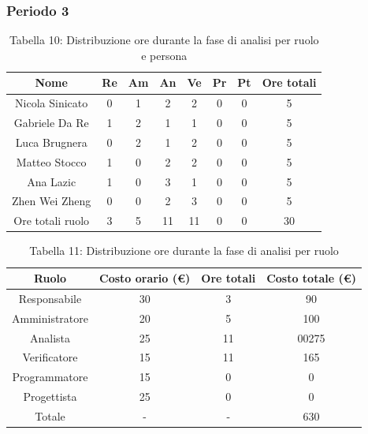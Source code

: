 \subsubsection{Periodo 3}
%
\begin{table}[h]
	\setlength\extrarowheight{5pt}
	\centering
	\begin{tabularx}{\textwidth}{|ccccccc|c|}
		\hline
		\rowcolor{white}
		\textbf{Nome} & \textbf{Re} & \textbf{Am} & \textbf{An} & \textbf{Ve} & \textbf{Pr}& \textbf{Pt} & \textbf{Ore totali} \\
		\hline
		Nicola Sinicato &0&1&2&2&0&0&5 \\
		Gabriele Da Re &1&2&1&1&0&0&5 \\
		Luca Brugnera &0&2&1&2&0&0&5 \\
		Matteo Stocco &1&0&2&2&0&0&5 \\
		Ana Lazic &1&0&3&1&0&0&5 \\
		Zhen Wei Zheng &0&0&2&3&0&0&5 \\
		\hline
		Ore totali ruolo &3&5&11&11&0&0&30 \\
		\hline
	\end{tabularx}
	\vspace{10pt}
	\caption{Tabella 10: Distribuzione ore durante la fase di analisi per ruolo e persona}
\end{table}
\begin{table}[h]
	\setlength\extrarowheight{5pt}
	\centering
	\begin{tabularx}{\textwidth}{|ccc|c|}
		\hline
		\rowcolor{white}
		\textbf{Ruolo} & \textbf{Costo orario (€)} & \textbf{Ore totali} & \textbf{Costo totale (€)} \\
		\hline
		Responsabile &30&3&90 \\
		Amministratore &20&5&100 \\
		Analista &25&11&00275 \\
		Verificatore &15&11&165 \\
		Programmatore &15&0&0 \\
		Progettista &25&0&0 \\
		\hline
		Totale &-&-&630 \\
		\hline
	\end{tabularx}
    \vspace{10pt}
	\caption{Tabella 11: Distribuzione ore durante la fase di analisi per ruolo}
\end{table}
